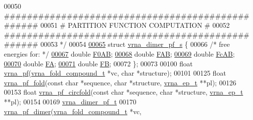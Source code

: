 \begin{DoxyCode}
00050 \textcolor{comment}{#################################################}
00051 \textcolor{comment}{# PARTITION FUNCTION COMPUTATION                #}
00052 \textcolor{comment}{#################################################}
00053 \textcolor{comment}{*/}
00054 
\hyperlink{group__pf__cofold}{00065} \textcolor{keyword}{struct }\hyperlink{group__pf__cofold_structvrna__dimer__pf__s}{vrna\_dimer\_pf\_s} \{
00066   \textcolor{comment}{/* free energies for: */}
\hyperlink{group__pf__cofold_a82e31d1fb6e95923fab6036f52c370af}{00067}   \textcolor{keywordtype}{double}  \hyperlink{group__pf__cofold_a82e31d1fb6e95923fab6036f52c370af}{F0AB}; 
\hyperlink{group__pf__cofold_a01a87f59db2b7fbf883b056e6f6c673a}{00068}   \textcolor{keywordtype}{double}  \hyperlink{group__pf__cofold_a01a87f59db2b7fbf883b056e6f6c673a}{FAB};  
\hyperlink{group__pf__cofold_a7b01cea5721f61badebc29cf0a9c4266}{00069}   \textcolor{keywordtype}{double}  \hyperlink{group__pf__cofold_a7b01cea5721f61badebc29cf0a9c4266}{FcAB}; 
\hyperlink{group__pf__cofold_a1aca57247f2c023d08028b1919005b0a}{00070}   \textcolor{keywordtype}{double}  \hyperlink{group__pf__cofold_a1aca57247f2c023d08028b1919005b0a}{FA};   
\hyperlink{group__pf__cofold_ab4d307be5400604d3c1d84d58a9981df}{00071}   \textcolor{keywordtype}{double}  \hyperlink{group__pf__cofold_ab4d307be5400604d3c1d84d58a9981df}{FB};   
00072 \};
00073 
00100 \textcolor{keywordtype}{float} \hyperlink{group__pf__fold_ga29e256d688ad221b78d37f427e0e99bc}{vrna\_pf}(\hyperlink{group__fold__compound_structvrna__fc__s}{vrna\_fold\_compound\_t} *vc, \textcolor{keywordtype}{char} *structure);
00101 
00125 \textcolor{keywordtype}{float} \hyperlink{group__pf__fold_gac4a2a74a79e49818bc35412a2b392c7e}{vrna\_pf\_fold}(\textcolor{keyword}{const} \textcolor{keywordtype}{char} *sequence, \textcolor{keywordtype}{char} *structure, \hyperlink{group__struct__utils_structvrna__elem__prob__s}{vrna\_ep\_t} **pl);
00126 
00153 \textcolor{keywordtype}{float} \hyperlink{group__pf__fold_ga87e5a77b6e50dd54e9d032a9b92973be}{vrna\_pf\_circfold}(\textcolor{keyword}{const} \textcolor{keywordtype}{char} *sequence, \textcolor{keywordtype}{char} *structure, 
      \hyperlink{group__struct__utils_structvrna__elem__prob__s}{vrna\_ep\_t} **pl);
00154 
00169 \hyperlink{group__pf__cofold_structvrna__dimer__pf__s}{vrna\_dimer\_pf\_t}
00170 \hyperlink{group__pf__cofold_ga4e5c7d06c302a7c59fc0d64dc142ca63}{vrna\_pf\_dimer}(\hyperlink{group__fold__compound_structvrna__fc__s}{vrna\_fold\_compound\_t}  *vc,

\end{DoxyCode}
